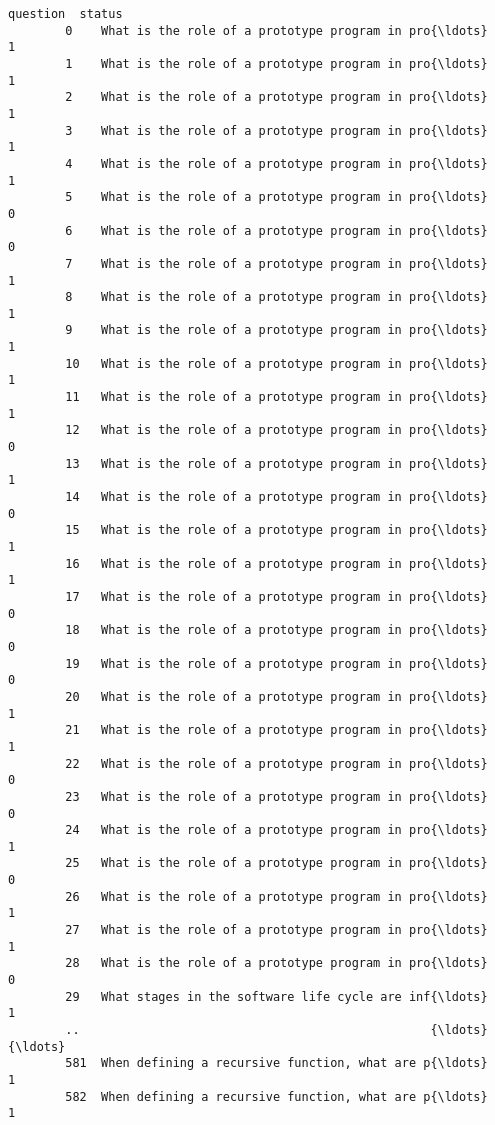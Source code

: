 \documentclass[11pt]{article}
\begin{document}
\begin{Verbatim}[commandchars=\\\{\}]
                                                      question  status  
        0    What is the role of a prototype program in pro{\ldots}       1  
        1    What is the role of a prototype program in pro{\ldots}       1  
        2    What is the role of a prototype program in pro{\ldots}       1  
        3    What is the role of a prototype program in pro{\ldots}       1  
        4    What is the role of a prototype program in pro{\ldots}       1  
        5    What is the role of a prototype program in pro{\ldots}       0  
        6    What is the role of a prototype program in pro{\ldots}       0  
        7    What is the role of a prototype program in pro{\ldots}       1  
        8    What is the role of a prototype program in pro{\ldots}       1  
        9    What is the role of a prototype program in pro{\ldots}       1  
        10   What is the role of a prototype program in pro{\ldots}       1  
        11   What is the role of a prototype program in pro{\ldots}       1  
        12   What is the role of a prototype program in pro{\ldots}       0  
        13   What is the role of a prototype program in pro{\ldots}       1  
        14   What is the role of a prototype program in pro{\ldots}       0  
        15   What is the role of a prototype program in pro{\ldots}       1  
        16   What is the role of a prototype program in pro{\ldots}       1  
        17   What is the role of a prototype program in pro{\ldots}       0  
        18   What is the role of a prototype program in pro{\ldots}       0  
        19   What is the role of a prototype program in pro{\ldots}       0  
        20   What is the role of a prototype program in pro{\ldots}       1  
        21   What is the role of a prototype program in pro{\ldots}       1  
        22   What is the role of a prototype program in pro{\ldots}       0  
        23   What is the role of a prototype program in pro{\ldots}       0  
        24   What is the role of a prototype program in pro{\ldots}       1  
        25   What is the role of a prototype program in pro{\ldots}       0  
        26   What is the role of a prototype program in pro{\ldots}       1  
        27   What is the role of a prototype program in pro{\ldots}       1  
        28   What is the role of a prototype program in pro{\ldots}       0  
        29   What stages in the software life cycle are inf{\ldots}       1  
        ..                                                 {\ldots}     {\ldots}  
        581  When defining a recursive function, what are p{\ldots}       1  
        582  When defining a recursive function, what are p{\ldots}       1  

\end{Verbatim}
\end{document}
